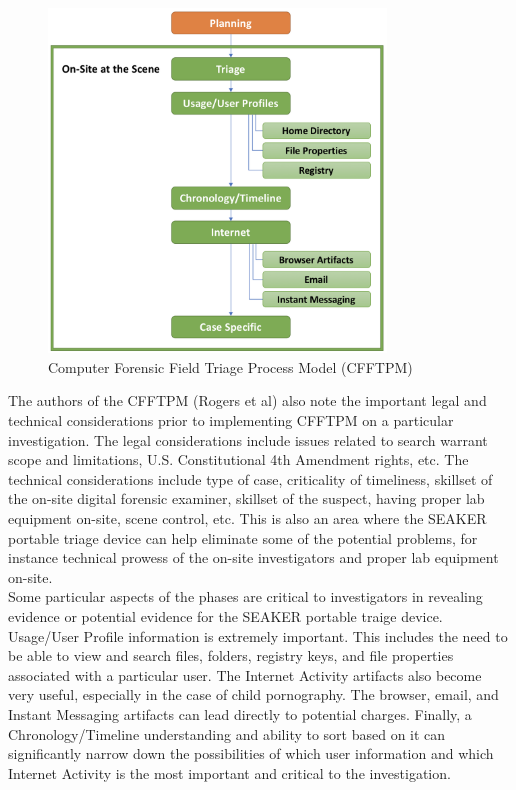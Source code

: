 \documentclass[12pt]{article}
\begin{document}
\begin{figure}[h]
  \centering
    \includegraphics[width=0.8\textwidth]{CFFTPM.png}
  \caption{Computer Forensic Field Triage Process Model (CFFTPM)}
\end{figure}

The authors of the CFFTPM (Rogers et al\cite{rogers2006computer}) also note the important legal and technical
considerations prior to implementing CFFTPM on a particular investigation.  The legal considerations include issues
related to search warrant scope and limitations, U.S. Constitutional 4th Amendment rights, etc.  The technical 
considerations include type of case, criticality of timeliness, skillset of the on-site digital forensic examiner, 
skillset of the suspect, having proper lab equipment on-site, scene control, etc.  This is also an area where the
SEAKER portable triage device can help eliminate some of the potential problems, for instance technical prowess of the
on-site investigators and proper lab equipment on-site.\\

Some particular aspects of the phases are critical to investigators in revealing evidence or potential evidence for
the SEAKER portable traige device.  Usage/User Profile information is extremely important.  This includes the need to
be able to view and search files, folders, registry keys, and file properties associated with a particular user.  The
Internet Activity artifacts also become very useful, especially in the case of child pornography.  The browser, email,
and Instant Messaging artifacts can lead directly to potential charges.  Finally, a Chronology/Timeline understanding
and ability to sort based on it can significantly narrow down the possibilities of which user information and which
Internet Activity is the most important and critical to the investigation.\\
\end{document}
